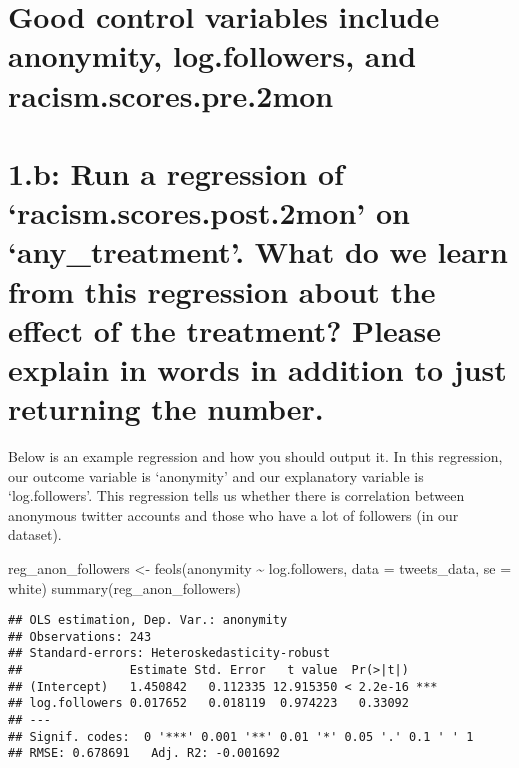 \documentclass[
]{article}
\newenvironment{Shaded}{\begin{snugshade}}{\end{snugshade}}
\newcommand{\AttributeTok}[1]{\textcolor[rgb]{0.77,0.63,0.00}{#1}}
\newcommand{\FunctionTok}[1]{\textcolor[rgb]{0.00,0.00,0.00}{#1}}
\newcommand{\NormalTok}[1]{#1}
\newcommand{\OtherTok}[1]{\textcolor[rgb]{0.56,0.35,0.01}{#1}}
\newcommand{\SpecialCharTok}[1]{\textcolor[rgb]{0.00,0.00,0.00}{#1}}
\newcommand{\StringTok}[1]{\textcolor[rgb]{0.31,0.60,0.02}{#1}}
\begin{document}
\hypertarget{good-control-variables-include-anonymity-log.followers-and-racism.scores.pre.2mon}{%
\section{Good control variables include anonymity, log.followers, and
racism.scores.pre.2mon}\label{good-control-variables-include-anonymity-log.followers-and-racism.scores.pre.2mon}}

\hypertarget{b-run-a-regression-of-racism.scores.post.2mon-on-any_treatment.-what-do-we-learn-from-this-regression-about-the-effect-of-the-treatment-please-explain-in-words-in-addition-to-just-returning-the-number.}{%
\section{1.b: Run a regression of `racism.scores.post.2mon' on
`any\_treatment'. What do we learn from this regression about the effect
of the treatment? Please explain in words in addition to just returning
the
number.}\label{b-run-a-regression-of-racism.scores.post.2mon-on-any_treatment.-what-do-we-learn-from-this-regression-about-the-effect-of-the-treatment-please-explain-in-words-in-addition-to-just-returning-the-number.}}

Below is an example regression and how you should output it. In this
regression, our outcome variable is `anonymity' and our explanatory
variable is `log.followers'. This regression tells us whether there is
correlation between anonymous twitter accounts and those who have a lot
of followers (in our dataset).

\begin{Shaded}
\begin{Highlighting}[]
\NormalTok{reg\_anon\_followers }\OtherTok{\textless{}{-}} \FunctionTok{feols}\NormalTok{(anonymity }\SpecialCharTok{\textasciitilde{}}\NormalTok{ log.followers, }\AttributeTok{data =}\NormalTok{ tweets\_data, }\AttributeTok{se =} \StringTok{\textquotesingle{}white\textquotesingle{}}\NormalTok{)}
\FunctionTok{summary}\NormalTok{(reg\_anon\_followers)}
\end{Highlighting}
\end{Shaded}

\begin{verbatim}
## OLS estimation, Dep. Var.: anonymity
## Observations: 243 
## Standard-errors: Heteroskedasticity-robust 
##               Estimate Std. Error   t value  Pr(>|t|)    
## (Intercept)   1.450842   0.112335 12.915350 < 2.2e-16 ***
## log.followers 0.017652   0.018119  0.974223   0.33092    
## ---
## Signif. codes:  0 '***' 0.001 '**' 0.01 '*' 0.05 '.' 0.1 ' ' 1
## RMSE: 0.678691   Adj. R2: -0.001692
\end{verbatim}
\end{document}
